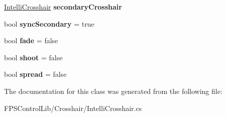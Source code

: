 \begin{DoxyCompactItemize}
\item 
\hypertarget{class_f_p_s_control_1_1_intelli_crosshair_a0dcc5591f6f0506599abac6095c64035}{\hyperlink{class_f_p_s_control_1_1_intelli_crosshair}{Intelli\-Crosshair} {\bfseries secondary\-Crosshair}}\label{class_f_p_s_control_1_1_intelli_crosshair_a0dcc5591f6f0506599abac6095c64035}

\item 
\hypertarget{class_f_p_s_control_1_1_intelli_crosshair_a7bee8f0828cdd2e8729dc842d3a5e801}{bool {\bfseries sync\-Secondary} = true}\label{class_f_p_s_control_1_1_intelli_crosshair_a7bee8f0828cdd2e8729dc842d3a5e801}

\item 
\hypertarget{class_f_p_s_control_1_1_intelli_crosshair_a36351030764ca60c7f8eceb9e1a2210b}{bool {\bfseries fade} = false}\label{class_f_p_s_control_1_1_intelli_crosshair_a36351030764ca60c7f8eceb9e1a2210b}

\item 
\hypertarget{class_f_p_s_control_1_1_intelli_crosshair_afde1d4c88dbe80a072c4234b668867aa}{bool {\bfseries shoot} = false}\label{class_f_p_s_control_1_1_intelli_crosshair_afde1d4c88dbe80a072c4234b668867aa}

\item 
\hypertarget{class_f_p_s_control_1_1_intelli_crosshair_af6684520d16ed8a0256b2c9d37cbd82d}{bool {\bfseries spread} = false}\label{class_f_p_s_control_1_1_intelli_crosshair_af6684520d16ed8a0256b2c9d37cbd82d}

\end{DoxyCompactItemize}


The documentation for this class was generated from the following file\-:\begin{DoxyCompactItemize}
\item 
F\-P\-S\-Control\-Lib/\-Crosshair/Intelli\-Crosshair.\-cs\end{DoxyCompactItemize}
